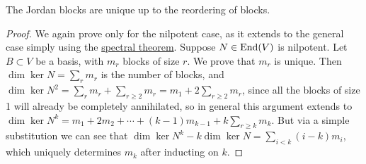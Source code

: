 \begin{theorem}
    The Jordan blocks are unique up to the reordering of blocks.
\end{theorem}
\begin{proof}
    We again prove only for the nilpotent case,
    as it extends to the general case simply using the \hyperref[thm:spectral]{spectral theorem}.
    Suppose \(N \in \operatorname{End}(V)\) is nilpotent.
    Let \(B \subset V\) be a basis, with \(m_r\) blocks of size \(r\).
    We prove that \(m_r\) is unique.
    Then \(\dim \ker N = \sum_r m_r\) is the number of blocks,
    and \(\dim \ker N^2 = \sum_r m_r + \sum_{r \geq 2} m_r = m_1 + 2\sum_{r \geq 2} m_r\),
    since all the blocks of size 1 will already be completely annihilated,
    so in general this argument extends to
    \(\dim \ker N^k = m_1 + 2m_2 + \cdots + (k-1)m_{k-1} + k\sum_{r \geq k} m_k\).
    But via a simple substitution we can see that
    \(\dim \ker N^k - k \dim \ker N = \sum_{i < k} (i-k)m_i\),
    which uniquely determines \(m_k\) after inducting on \(k\).
\end{proof}
